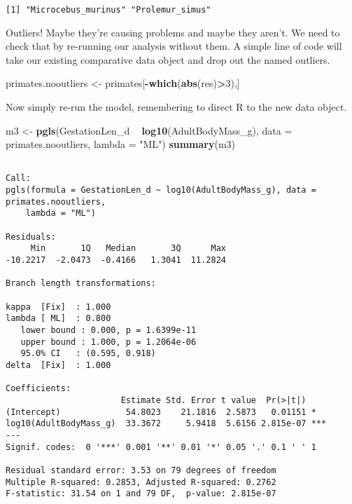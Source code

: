 \documentclass[]{book}
\newenvironment{Shaded}{\begin{snugshade}}{\end{snugshade}}
\newcommand{\KeywordTok}[1]{\textcolor[rgb]{0.13,0.29,0.53}{\textbf{#1}}}
\newcommand{\DataTypeTok}[1]{\textcolor[rgb]{0.13,0.29,0.53}{#1}}
\newcommand{\DecValTok}[1]{\textcolor[rgb]{0.00,0.00,0.81}{#1}}
\newcommand{\StringTok}[1]{\textcolor[rgb]{0.31,0.60,0.02}{#1}}
\newcommand{\OperatorTok}[1]{\textcolor[rgb]{0.81,0.36,0.00}{\textbf{#1}}}
\newcommand{\NormalTok}[1]{#1}
\begin{document}
\begin{verbatim}
[1] "Microcebus_murinus" "Prolemur_simus"    
\end{verbatim}

Outliers! Maybe they're causing problems and maybe they aren't. We need
to check that by re-running our analysis without them. A simple line of
code will take our existing comparative data object and drop out the
named outliers.

\begin{Shaded}
\begin{Highlighting}[]
\NormalTok{primates.nooutliers <-}\StringTok{ }\NormalTok{primates[}\OperatorTok{-}\KeywordTok{which}\NormalTok{(}\KeywordTok{abs}\NormalTok{(res)}\OperatorTok{>}\DecValTok{3}\NormalTok{),]}
\end{Highlighting}
\end{Shaded}

Now simply re-run the model, remembering to direct R to the new data
object.

\begin{Shaded}
\begin{Highlighting}[]
\NormalTok{m3 <-}\StringTok{ }\KeywordTok{pgls}\NormalTok{(GestationLen_d }\OperatorTok{~}\StringTok{ }\KeywordTok{log10}\NormalTok{(AdultBodyMass_g),}
           \DataTypeTok{data =}\NormalTok{ primates.nooutliers, }
           \DataTypeTok{lambda =} \StringTok{"ML"}\NormalTok{)}
\KeywordTok{summary}\NormalTok{(m3)}
\end{Highlighting}
\end{Shaded}

\begin{verbatim}

Call:
pgls(formula = GestationLen_d ~ log10(AdultBodyMass_g), data = primates.nooutliers, 
    lambda = "ML")

Residuals:
     Min       1Q   Median       3Q      Max 
-10.2217  -2.0473  -0.4166   1.3041  11.2824 

Branch length transformations:

kappa  [Fix]  : 1.000
lambda [ ML]  : 0.800
   lower bound : 0.000, p = 1.6399e-11
   upper bound : 1.000, p = 1.2064e-06
   95.0% CI   : (0.595, 0.918)
delta  [Fix]  : 1.000

Coefficients:
                       Estimate Std. Error t value  Pr(>|t|)    
(Intercept)             54.8023    21.1816  2.5873   0.01151 *  
log10(AdultBodyMass_g)  33.3672     5.9418  5.6156 2.815e-07 ***
---
Signif. codes:  0 '***' 0.001 '**' 0.01 '*' 0.05 '.' 0.1 ' ' 1

Residual standard error: 3.53 on 79 degrees of freedom
Multiple R-squared: 0.2853, Adjusted R-squared: 0.2762 
F-statistic: 31.54 on 1 and 79 DF,  p-value: 2.815e-07 
\end{verbatim}
\end{document}

